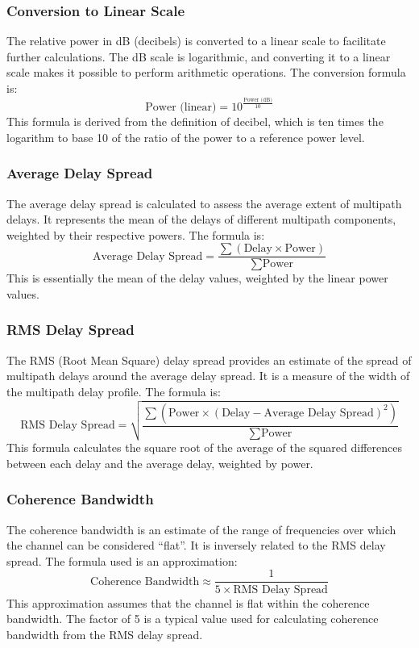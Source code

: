 \documentclass{article}
\begin{document}
\subsubsection{Conversion to Linear Scale}
The relative power in dB (decibels) is converted to a linear scale to facilitate further calculations. The dB scale is logarithmic, and converting it to a linear scale makes it possible to perform arithmetic operations. The conversion formula is:
\begin{equation}
    \text{Power (linear)} = 10^{\frac{\text{Power (dB)}}{10}}
\end{equation}
This formula is derived from the definition of decibel, which is ten times the logarithm to base 10 of the ratio of the power to a reference power level.

\subsubsection{Average Delay Spread}
The average delay spread is calculated to assess the average extent of multipath delays. It represents the mean of the delays of different multipath components, weighted by their respective powers. The formula is:
\begin{equation}
    \text{Average Delay Spread} = \frac{\sum (\text{Delay} \times \text{Power})}{\sum \text{Power}}
\end{equation}
This is essentially the mean of the delay values, weighted by the linear power values.

\subsubsection{RMS Delay Spread}
The RMS (Root Mean Square) delay spread provides an estimate of the spread of multipath delays around the average delay spread. It is a measure of the width of the multipath delay profile. The formula is:
\begin{equation}
    \text{RMS Delay Spread} = \sqrt{\frac{\sum (\text{Power} \times (\text{Delay} - \text{Average Delay Spread})^2)}{\sum \text{Power}}}
\end{equation}
This formula calculates the square root of the average of the squared differences between each delay and the average delay, weighted by power.

\subsubsection{Coherence Bandwidth}
The coherence bandwidth is an estimate of the range of frequencies over which the channel can be considered “flat”. It is inversely related to the RMS delay spread. The formula used is an approximation:
\begin{equation}
    \text{Coherence Bandwidth} \approx \frac{1}{5 \times \text{RMS Delay Spread}}
\end{equation}
This approximation assumes that the channel is flat within the coherence bandwidth. The factor of 5 is a typical value used for calculating coherence bandwidth from the RMS delay spread.
\end{document}
